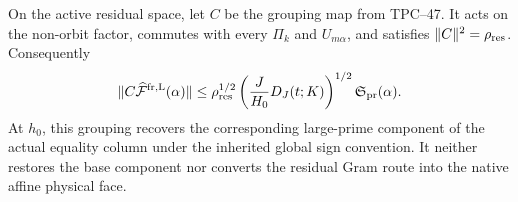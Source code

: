 On the active residual space, let \(C\) be the grouping map from
TPC--47.  It acts on the non-orbit factor, commutes with every \(\Pi_k\)
and \(U_{m\alpha}\), and satisfies \(\|C\|^2=\rho_{\rm res}\).
Consequently
\begin{equation}
 \|C\widehat{\mathcal F}^{\rm fr,\mathrm L}(\alpha)\|
 \le\rho_{\rm res}^{1/2}
 \left(\frac{J}{H_0}D_J(t;K)\right)^{1/2}
 \mathfrak S_{\rm pr}(\alpha).
 \label{eq:tpc48-grouped-actual-bound}
\end{equation}
At \(h_0\), this grouping recovers the corresponding large-prime
component of the actual equality column under the inherited global
sign convention.  It neither restores the base component nor converts
the residual Gram route into the native affine physical face.
